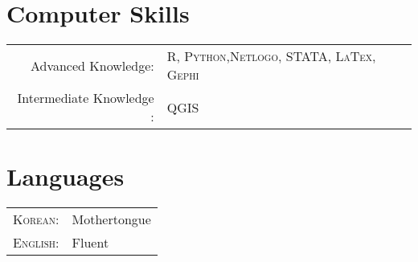 \documentclass[a4paper,10pt]{article}
\begin{document}


 


\section{Computer Skills}
\begin{tabular}{rl}
Advanced Knowledge: & \textsc{R}, \textsc{Python},\textsc{Netlogo}, \textsc{STATA}, \textsc{LaTex}, \textsc{Gephi}\\ 
 
Intermediate Knowledge :  & \textsc{QGIS}\\


\end{tabular}



\section{Languages}
\begin{tabular}{rl}
 \textsc{Korean:}&Mothertongue\\
\textsc{English:}&Fluent\\

\end{tabular}

\end{document}
